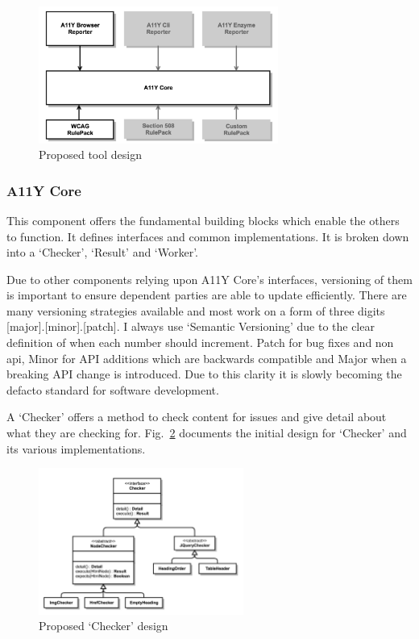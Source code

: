 \begin{figure}[H]
\centering
\includegraphics[width=0.7\textwidth]{figures/a11y_tool_proposed_design}
\captionsetup{justification=centering}
\caption{Proposed tool design
\label{fig:tool_proposed_design}}
\end{figure}

\subsubsection{A11Y Core}
This component offers the fundamental building blocks which enable the
others to function. It defines interfaces and common implementations. It is
broken down into a `Checker', `Result' and `Worker'.

Due to other components relying upon A11Y Core's interfaces, versioning of
them is important to ensure dependent parties are able to update efficiently.
There are many versioning strategies available and most work on a form of
three digits [major].[minor].[patch]. I always use `Semantic Versioning'
due to the clear definition of when each number should increment. Patch for
bug fixes and non api, Minor for API additions which are backwards compatible
and Major when a breaking API change is introduced. Due to this clarity it is
slowly becoming the defacto standard for software development.

A `Checker' offers a method to check content for issues and give detail
about what they are checking for. Fig.~\ref{fig:checker_design} documents the
initial design for `Checker' and its various implementations.

\begin{figure}[H]
\centering
\includegraphics[width=0.6\textwidth]{figures/a11y_tool_checkers}
\captionsetup{justification=centering}
\caption{Proposed `Checker' design
\label{fig:checker_design}}
\end{figure}

